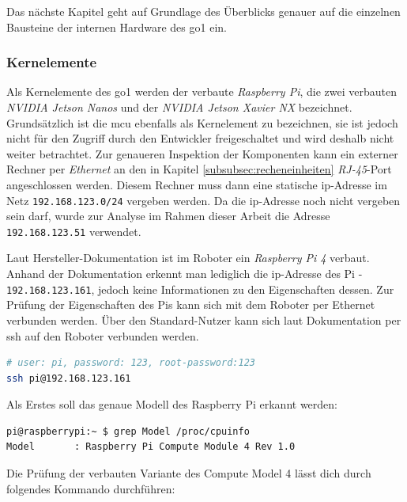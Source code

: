 Das nächste Kapitel geht auf Grundlage des Überblicks genauer auf die einzelnen Bausteine der internen Hardware des \gls{go1}
ein.

\subsubsection{Kernelemente}
\label{subsubsec:kernelemente}

Als Kernelemente des \gls{go1} werden der verbaute \emph{Raspberry Pi}, die zwei verbauten \emph{NVIDIA Jetson Nanos} und
der \emph{NVIDIA Jetson Xavier NX} bezeichnet.
Grundsätzlich ist die \gls{mcu} ebenfalls als Kernelement zu bezeichnen, sie ist jedoch nicht für den Zugriff durch den
Entwickler freigeschaltet und wird deshalb nicht weiter betrachtet.
Zur genaueren Inspektion der Komponenten kann ein externer Rechner per \emph{Ethernet} an den in Kapitel \ref{subsubsec:recheneinheiten}
\emph{RJ-45}-Port angeschlossen werden.
Diesem Rechner muss dann eine statische \gls{ip}-Adresse im Netz \texttt{192.168.123.0/24} vergeben werden.
Da die \gls{ip}-Adresse noch nicht vergeben sein darf, wurde zur Analyse im Rahmen dieser Arbeit die Adresse \texttt{192.168.123.51}
verwendet.

\label{par:raspi}

Laut Hersteller-Dokumentation ist im Roboter ein \emph{Raspberry Pi \num{4}} verbaut.
Anhand der Dokumentation erkennt man lediglich die \gls{ip}-Adresse des Pi - \texttt{192.168.123.161}, jedoch keine Informationen
zu den Eigenschaften dessen.
Zur Prüfung der Eigenschaften des Pis kann sich mit dem Roboter per Ethernet verbunden werden.
Über den Standard-Nutzer kann sich laut Dokumentation per \gls{ssh} auf den Roboter verbunden werden.

\begin{lstlisting}[language=sh,label=lst:pi-ssh]
# user: pi, password: 123, root-password:123
ssh pi@192.168.123.161
\end{lstlisting}

\noindent Als Erstes soll das genaue Modell des Raspberry Pi erkannt werden:

\begin{lstlisting}[language=sh, label=lst:pi-model]
pi@raspberrypi:~ $ grep Model /proc/cpuinfo
Model		: Raspberry Pi Compute Module 4 Rev 1.0
\end{lstlisting}

\noindent Die Prüfung der verbauten Variante des Compute Model 4 lässt dich durch folgendes Kommando durchführen:

